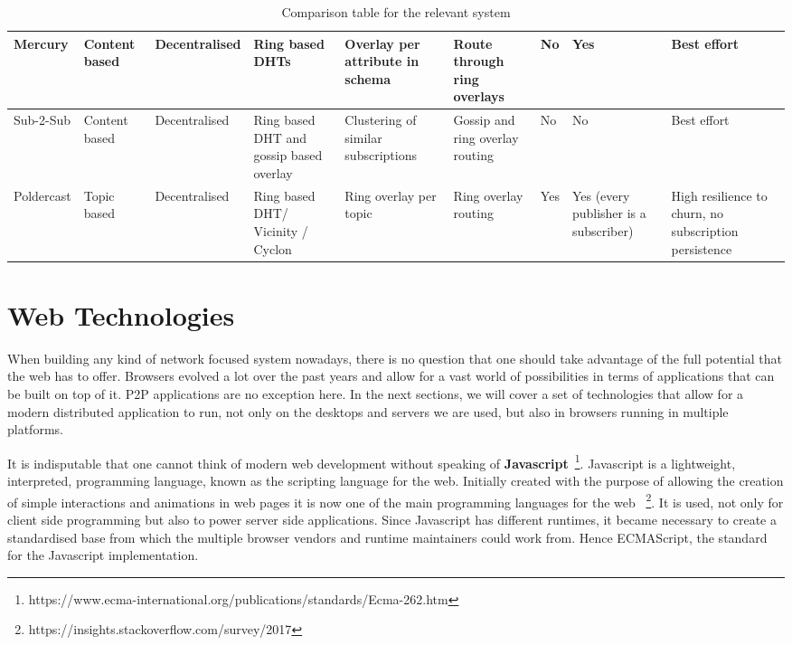 \begin{table}
\begin{tabular}{|P{3cm}|P{2cm}P{2cm}P{2cm}P{2.5cm}P{2cm}P{2cm}P{2cm}P{2cm}|}
    Mercury & Content based & Decentralised & Ring based DHTs & Overlay per attribute in schema & Route through ring overlays & No & Yes & Best effort \\\hline
    Sub-2-Sub & Content based & Decentralised & Ring based DHT and gossip based overlay & Clustering of similar subscriptions & Gossip and ring overlay routing & No & No & Best effort \\\hline
    Poldercast & Topic based & Decentralised & Ring based DHT/ Vicinity / Cyclon & Ring overlay per topic & Ring overlay routing & Yes & Yes (every publisher is a subscriber) & High resilience to churn, no subscription persistence \\\hline
    \end{tabular}
  \caption{Comparison table for the relevant system}
  \label{table:relevant-systems}
\end{table}
\section{Web Technologies}\label{web-technologies}

When building any kind of network focused system nowadays, there is no question
that one should take advantage of the full potential that the web has to offer.
Browsers evolved a lot over the past years and allow for a vast world of
possibilities in terms of applications that can be built on top of it. P2P
applications are no exception here. In the next sections, we will cover a set
of technologies that allow for a modern distributed application to run, not
only on the desktops and servers we are used, but also in browsers running in
multiple platforms.

It is indisputable that one cannot think of modern web development
without speaking of \textbf{Javascript}~\footnote{https://www.ecma-international.org/publications/standards/Ecma-262.htm}.
Javascript is a lightweight, interpreted, programming language, known as
the scripting language for the web. Initially created with the purpose
of allowing the creation of simple interactions and animations in web
pages it is now one of the main programming languages for the web
~\footnote{https://insights.stackoverflow.com/survey/2017}. It is used, not
only for client side programming but also to power server side
applications. Since Javascript has different runtimes, it became
necessary to create a standardised base from which the multiple browser
vendors and runtime maintainers could work from. Hence ECMAScript, the standard
for the Javascript implementation.

